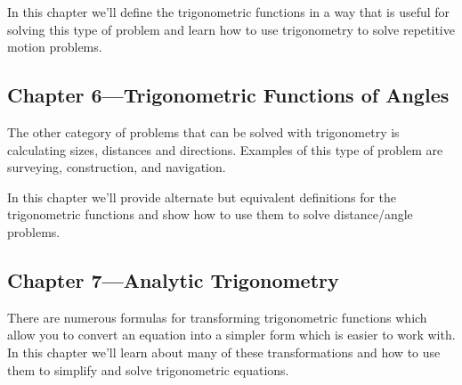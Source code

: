 \documentclass[fleqn, onecolumn]{article}
\begin{document}
  In this chapter we'll define the trigonometric functions in a way that is useful for solving this type of problem and
  learn how to use trigonometry to solve repetitive motion problems.



  \subsection{Chapter 6---Trigonometric Functions of Angles}

  The other category of problems that can be solved with trigonometry is calculating sizes, distances and directions.
  Examples of this type of problem are surveying, construction, and navigation.

  In this chapter we'll provide alternate but equivalent definitions for the trigonometric functions and show how to use
  them to solve distance/angle problems.


  \subsection{Chapter 7---Analytic Trigonometry}

  There are numerous formulas for transforming trigonometric functions which allow you to convert an equation into a
  simpler form which is easier to work with.  In this chapter we'll learn about many of these transformations and how to
  use them to simplify and solve trigonometric equations.

\end{document}

